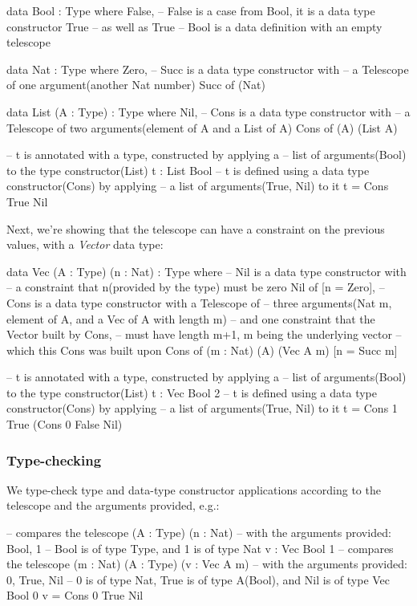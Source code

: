 \documentclass[
       embeddedlogo,
       english,
       lmodern,
       coorientadorbanca,
       noabntexcite
]{ufsc-thesis-rn46-2019}
\theoremstyle{definition}
\begin{document}
\begin{piforall}
data Bool : Type where {
       False,  -- False is a case from Bool, it is a data type constructor
       True    -- as well as True
} -- Bool is a data definition with an empty telescope

data Nat : Type where {
       Zero,
       -- Succ is a data type constructor with
       -- a Telescope of one argument(another Nat number)
       Succ of (Nat)
}

data List (A : Type) : Type where {
       Nil,
       -- Cons is a data type constructor with
       -- a Telescope of two arguments(element of A and a List of A)
       Cons of (A) (List A)
}

-- t is annotated with a type, constructed by applying a
-- list of arguments(Bool) to the type constructor(List)
t : List Bool
-- t is defined using a data type constructor(Cons) by applying
-- a list of arguments(True, Nil) to it
t = Cons True Nil
\end{piforall}

Next, we're showing that the telescope can have a constraint on the previous values, with a \emph{Vector} data type:

\begin{piforall}
data Vec (A : Type) (n : Nat) : Type where {
  -- Nil is a data type constructor with
  -- a constraint that n(provided by the type) must be zero
  Nil of [n = Zero],
  -- Cons is a data type constructor with a Telescope of 
  -- three arguments(Nat m, element of A, and a Vec of A with length m)
  -- and one constraint that the Vector built by Cons,
  -- must have length m+1, m being the underlying vector
  -- which this Cons was built upon
  Cons of (m : Nat) (A) (Vec A m) [n = Succ m]
}

-- t is annotated with a type, constructed by applying a
-- list of arguments(Bool) to the type constructor(List)
t : Vec Bool 2
-- t is defined using a data type constructor(Cons) by applying
-- a list of arguments(True, Nil) to it
t = Cons 1 True (Cons 0 False Nil)
\end{piforall}

\subsubsection{Type-checking}

We type-check type and data-type constructor applications according to the telescope and the arguments provided, e.g.:

\begin{piforall}
-- compares the telescope (A : Type) (n : Nat)
-- with the arguments provided: Bool, 1
-- Bool is of type Type, and 1 is of type Nat
v : Vec Bool 1
-- compares the telescope (m : Nat) (A : Type) (v : Vec A m)
-- with the arguments provided: 0, True, Nil
-- 0 is of type Nat, True is of type A(Bool), and Nil is of type Vec Bool 0
v = Cons 0 True Nil
\end{piforall}
\end{document}
